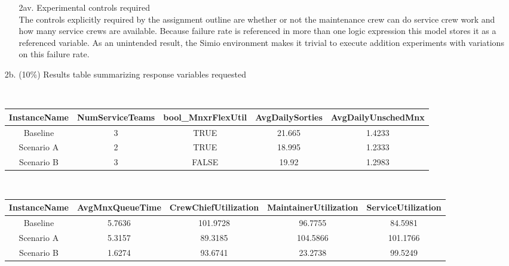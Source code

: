 \documentclass[answers]{exam}
\begin{document}
\begin{questions}
\begin{enumerate}
\begin{solution}
\begin{enumerate}
			\item[2av.] Experimental controls required \\
				The controls explicitly required by the assignment outline are
				whether or not the maintenance crew can do service crew work 
				and how many service crews are available.
				Because failure rate is referenced in more than one logic
				expression this model stores it as a referenced variable.
				As an unintended result, the Simio environment makes it trivial
				to execute addition experiments with variations on this failure rate.
		\end{enumerate}
	\end{solution}
	\item[2b.] (10\%) Results table summarizing response variables requested \\
	\begin{solution} \bigskip \\
		\begin{tabular}{c|cccc}
			\footnotesize InstanceName & \footnotesize NumServiceTeams & \footnotesize bool\_MnxrFlexUtil & 
			\footnotesize AvgDailySorties & \footnotesize AvgDailyUnschedMnx \\
			\midrule
			Baseline   & 3 & TRUE  & 21.665 & 1.4233 \\
			Scenario A & 2 & TRUE  & 18.995 & 1.2333 \\
			Scenario B & 3 & FALSE & 19.92  & 1.2983 \\
		\end{tabular} \phantom{text} 
		\bigskip \\
		\begin{tabular}{c|cccc}
			\footnotesize InstanceName & \footnotesize AvgMnxQueueTime & \footnotesize CrewChiefUtilization & 
			\footnotesize MaintainerUtilization & \footnotesize ServiceUtilization  \\
			\midrule
			Baseline   & 5.7636 & 101.9728 & 96.7755  & 84.5981  \\
			Scenario A & 5.3157 & 89.3185  & 104.5866 & 101.1766 \\
			Scenario B & 1.6274 & 93.6741  & 23.2738  & 99.5249  \\
		\end{tabular} \vspace{3em}
		

\end{solution}
\end{enumerate}
\end{questions}
\end{document}
